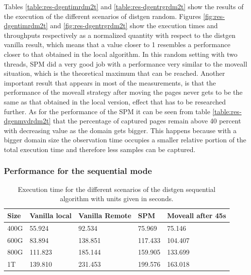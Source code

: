 Tables \ref{table:res-dgentimrdm2t} and \ref{table:res-dgentrgrdm2t} show the results of the execution of the different scenarios of distgen random. Figures \ref{fig:res-dgentimrdm2t} and \ref{fig:res-dgentrgrdm2t} show the execution times and throughputs respectively as a normalized quantity with respect to the distgen vanilla result, which means that a value closer to 1 resembles a performance closer to that obtained in the local algorithm. In this random setting with two threads, SPM did a very good job with a performance very similar to the moveall situation, which is the theoretical maximum that can be reached. Another important result that appears in most of the measurements, is that the performance of the moveall strategy after moving the pages never gets to be the same as that obtained in the local version, effect that has to be researched further.
As for the performance of the SPM it can be seen from table \ref{table:res-dgenmvdrdm2t} that the percentage of captured pages remain above 40 percent with decreasing value as the domain gets bigger. This happens because with a bigger domain size the observation time occupies a smaller relative portion of the total execution time and therefore less samples can be captured.

\FloatBarrier
\subsubsection{Performance for the sequential mode}\label{subsection:res-dgseq-2t}

\begin{table}[th]
	\centering
		\begin{tabularx}{\textwidth}{|l|l|l|l|X|}
		\hline
			Size & Vanilla local & Vanilla Remote & SPM & Moveall after 45s  \\
			\hline
			400G & 55.924 & 92.534  & 75.969 & 75.146\\
			\hline
			600G & 83.894 & 138.851 & 117.433 & 104.407 \\
			\hline
			800G & 111.823 & 185.144 & 159.905 & 133.699 \\
			\hline
			1T & 139.810 & 231.453 & 199.576 & 163.018 \\
			\hline
		\end{tabularx}
		\caption{Execution time for the different scenarios of the distgen sequential algorithm with units given in seconds.}
		\label{table:res-tbl-dgentimseq2t}
\end{table}

